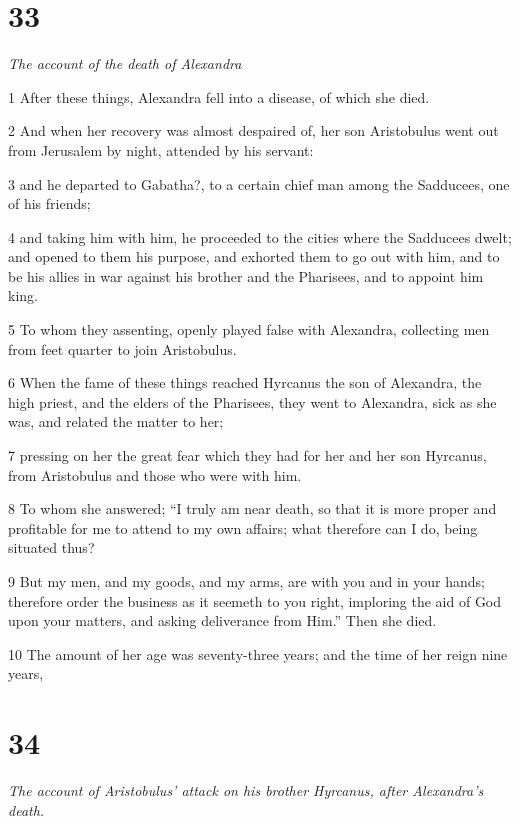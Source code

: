 \chapter{33}

\par \textit{The account of the death of Alexandra}

1 After these things, Alexandra fell into a disease, of which she died. 

2 And when her recovery was almost despaired of, her son Aristobulus went out from Jerusalem by night, attended by his servant: 

3 and he departed to Gabatha?, to a certain chief man among the Sadducees, one of his friends; 

4 and taking him with him, he proceeded to the cities where the Sadducees dwelt; and opened to them his purpose, and exhorted them to go out with him, and to be his allies in war against his brother and the Pharisees, and to appoint him king. 

5 To whom they assenting, openly played false with Alexandra, collecting men from feet quarter to join Aristobulus. 

6 When the fame of these things reached Hyrcanus the son of Alexandra, the high priest, and the elders of the Pharisees, they went to Alexandra, sick as she was, and related the matter to her; 

7 pressing on her the great fear which they had for her and her son Hyrcanus, from Aristobulus and those who were with him. 

8 To whom she answered; “I truly am near death, so that it is more proper and profitable for me to attend to my own affairs; what therefore can I do, being situated thus? 

9 But my men, and my goods, and my arms, are with you and in your hands; therefore order the business as it seemeth to you right, imploring the aid of God upon your matters, and asking deliverance from Him.” Then she died. 

10 The amount of her age was seventy-three years; and the time of her reign nine years,

\chapter{34}

\par \textit{The account of Aristobulus’ attack on his brother Hyrcanus, after Alexandra’s death.}

